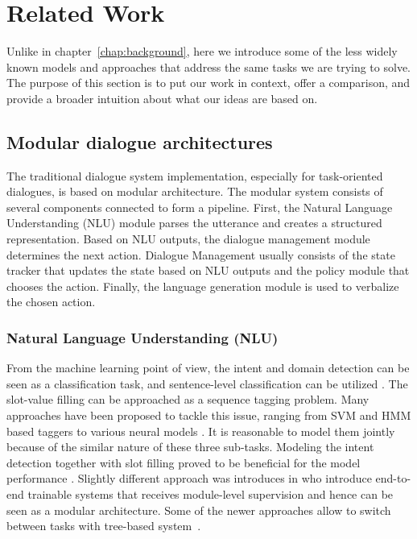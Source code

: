 \chapter{Related Work}%
\label{chap:related}
\label{sec:relwork}
Unlike in chapter~\ref{chap:background}, here we introduce some of the less widely known models and approaches that address the same tasks we are trying to solve.
The purpose of this section is to put our work in context, offer a comparison, and provide a broader intuition about what our ideas are based on.

\section{Modular dialogue architectures}
\label{relwork:modular}
The traditional dialogue system implementation, especially for task-oriented dialogues, is based on modular architecture.
The modular system consists of several components connected to form a pipeline.
First, the Natural Language Understanding (NLU) module parses the utterance and creates a structured representation.
Based on NLU outputs, the dialogue management module determines the next action.
Dialogue Management usually consists of the state tracker that updates the state based on NLU outputs and the policy module that chooses the action.
Finally, the language generation module is used to verbalize the chosen action.
\subsection{Natural Language Understanding (NLU)}
From the machine learning point of view, the intent and domain detection can be seen as a classification task, and sentence-level classification can be utilized \cite{yaman2008integrative,schapire2000boostexter}.
The slot-value filling can be approached as a sequence tagging problem.
Many approaches have been proposed to tackle this issue, ranging from SVM \cite{shi2016recurrent} and HMM \cite{surendran2006dialog} based taggers to various neural models \cite{adel2016comparing, zhang2017position, mesnil2014using}.
It is reasonable to model them jointly because of the similar nature of these three sub-tasks.
Modeling the intent detection together with slot filling proved to be beneficial for the model performance \cite{zhang2017position, liu2016attention, xu2013convolutional}.
Slightly different approach was introduces in \citet{DBLP:conf/aaai/LiangTCY20} who introduce end-to-end trainable systems that receives module-level supervision and hence can be seen as a modular architecture.
Some of the newer approaches allow to switch between tasks with tree-based system~\cite{xie2022converse}.

